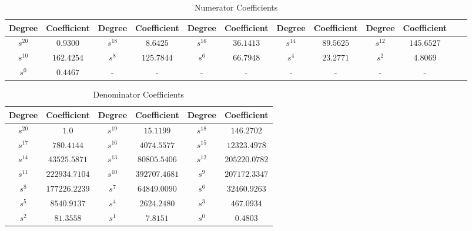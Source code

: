 \documentclass{article}
\begin{document}
\begin{table}[H]
  \centering
      \begin{adjustwidth}{-2.5cm}{}
      \caption{Numerator Coefficients}
      \begin{tabular}{|c|c|c|c|c|c|c|c|c|c|c|c|}
\hline
Degree & Coefficient & Degree & Coefficient & Degree & Coefficient & Degree & Coefficient & Degree & Coefficient\\
\hline
$s^{ 20 }$ & $ 0.9300 $ & $s^{ 18 }$ & $ 8.6425 $ & $s^{ 16 }$ & $ 36.1413 $  & $s^{ 14 }$ & $ 89.5625 $ & $s^{ 12 }$ & $ 145.6527 $ \\
\hline
$s^{ 10 }$ & $ 162.4254 $ & $s^{ 8 }$ & $ 125.7844 $ & $s^{ 6 }$ & $ 66.7948 $  & $s^{ 4 }$ & $ 23.2771 $ & $s^{ 2 }$ & $ 4.8069 $ \\
\hline
$s^{ 0 }$ & $ 0.4467 $ & - & - & - & - & - & - & - & - \\
\hline
  	\end{tabular}
    \end{adjustwidth}
\end{table}


\begin{table}[H]
    \centering
    \begin{adjustwidth}{0cm}{}
        \caption{Denominator Coefficients}
        \begin{tabular}{|c|c|c|c|c|c|}
            \hline
            Degree & Coefficient & Degree & Coefficient & Degree & Coefficient \\
            \hline
            $s^{20}$ & $1.0$ & $s^{19}$ & $15.1199$ & $s^{18}$ & $146.2702$ \\
            \hline
            $s^{17}$ & $780.4144$ & $s^{16}$ & $4074.5577$ & $s^{15}$ & $12323.4978$ \\
            \hline
            $s^{14}$ & $43525.5871$ & $s^{13}$ & $80805.5406$ & $s^{12}$ & $205220.0782$ \\
            \hline
            $s^{11}$ & $222934.7104$ & $s^{10}$ & $392707.4681$ & $s^{9}$ & $207172.3347$ \\
            \hline
            $s^{8}$ & $177226.2239$ & $s^{7}$ & $64849.0090$ & $s^{6}$ & $32460.9263$ \\
            \hline
            $s^{5}$ & $8540.9137$ & $s^{4}$ & $2624.2480$ & $s^{3}$ & $467.0934$ \\
            \hline
            $s^{2}$ & $81.3558$ & $s^{1}$ & $7.8151$ & $s^{0}$ & $0.4803$ \\
            \hline
        \end{tabular}
    \end{adjustwidth}
\end{table}
\end{document}
